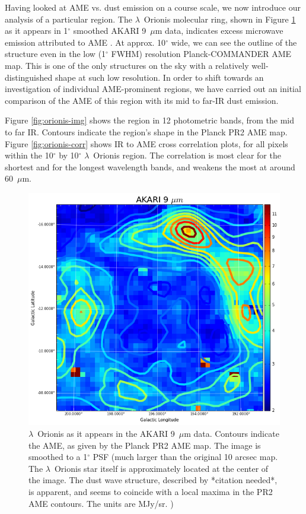\documentclass[preprint2,longabstract]{aastex}
\begin{document}
	Having looked at AME vs. dust emission on a course scale, we now introduce our analysis of a particular region. The $\lambda$~Orionis molecular ring, shown in Figure \ref{fig:orionis-akari9} as it appears in 1$^{\circ}$ smoothed AKARI 9~$\mu$m data, indicates excess microwave emission attributed to AME \citep{planck15XXV}. At approx. 10$^{\circ}$ wide, we can see the outline of the structure even in the low (1$^{\circ}$ FWHM) resolution Planck-COMMANDER AME map. This is one of the only structures on the sky with a relatively well-distinguished shape at such low resolution. In order to shift towards an investigation of individual AME-prominent regions, we have carried out an initial comparison of the AME of this region with its mid to far-IR dust emission.

	Figure \ref{fig:orionis-img} shows the region in 12 photometric bands, from the mid to far IR. Contours indicate the region's shape in the Planck PR2 AME map. Figure \ref{fig:orionis-corr} shows IR to AME cross correlation plots, for all pixels within the 10$^{\circ}$ by 10$^{\circ}$ $\lambda$~Orionis region. The correlation is most clear for the shortest and for the longest wavelength bands, and weakens the most at around 60~$\mu$m.

\begin{figure}
  \label{fig:orionis-akari9}
  \includegraphics[width=150mm]{../Plots/lOrionis_AKARI9.png}
  \centering
  \caption{$\lambda$~Orionis as it appears in the AKARI 9~$\mu$m data. Contours indicate the AME, as given by the Planck PR2 AME map. The image is smoothed to a 1$^{\circ}$ PSF (much larger than the original 10 arcsec map. The $\lambda$~Orionis star itself is approximately located at the center of the image. The dust wave structure, described by *citation needed*, is apparent, and seems to coincide with a local maxima in the PR2 AME contours. The units are MJy/sr. )}
\end{figure}
\end{document}
